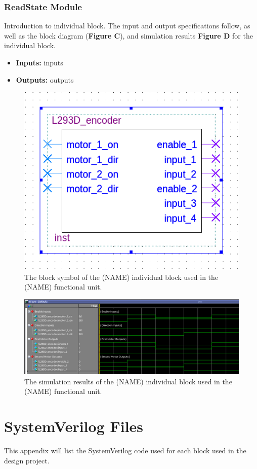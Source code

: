 \documentclass[a4paper]{article}
\begin{document}
\clearpage



\subsubsection{ReadState Module}
Introduction to individual block. The input and output specifications follow, as well as the block diagram (\textbf{Figure C}), and simulation results \textbf{Figure D} for the individual block.
\begin{itemize}
  \item \textbf{Inputs:  } inputs
  \item \textbf{Outputs: } outputs
\end{itemize}
\begin{figure}[h]
  \centering
  \includegraphics[width=.48\textwidth]{symbols/individual_placeholder.png}
  \caption{The block symbol of the (NAME) individual block used in the (NAME) functional unit.}
    \label{fig:individual-1-2-block}
\end{figure}
\begin{figure}[h]
  \centering
  \includegraphics[width=.98\textwidth]{sims/placeholder_sim.png}
  \caption{The simulation results of the (NAME) individual block used in the (NAME) functional unit.}
    \label{fig:individual-1-2-sim}
\end{figure}




\clearpage



\appendix
\section{SystemVerilog Files}
This appendix will list the SystemVerilog code used for each block used in the design project.
\end{document}
